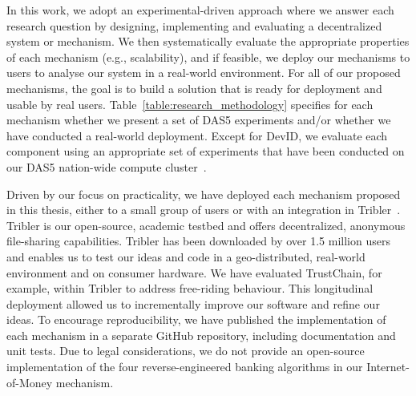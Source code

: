 In this work, we adopt an experimental-driven approach where we answer each research question by designing, implementing and evaluating a decentralized system or mechanism.
We then systematically evaluate the appropriate properties of each mechanism (e.g., scalability), and if feasible, we deploy our mechanisms to users to analyse our system in a real-world environment.
For all of our proposed mechanisms, the goal is to build a solution that is ready for deployment and usable by real users.
Table~\ref{table:research_methodology} specifies for each mechanism whether we present a set of DAS5 experiments and/or whether we have conducted a real-world deployment.
Except for DevID, we evaluate each component using an appropriate set of experiments that have been conducted on our DAS5 nation-wide compute cluster~\cite{bal2016medium}.

Driven by our focus on practicality, we have deployed each mechanism proposed in this thesis, either to a small group of users or with an integration in Tribler~\cite{zeilemaker2011tribler}.
Tribler is our open-source, academic testbed and offers decentralized, anonymous file-sharing capabilities.
Tribler has been downloaded by over 1.5 million users and enables us to test our ideas and code in a geo-distributed, real-world environment and on consumer hardware.
We have evaluated TrustChain, for example, within Tribler to address free-riding behaviour.
This longitudinal deployment allowed us to incrementally improve our software and refine our ideas.
To encourage reproducibility, we have published the implementation of each mechanism in a separate GitHub repository, including documentation and unit tests.
Due to legal considerations, we do not provide an open-source implementation of the four reverse-engineered banking algorithms in our Internet-of-Money mechanism.




